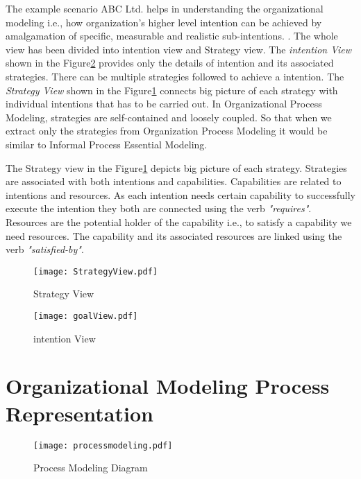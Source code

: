 \hspace{4ex} The example scenario ABC Ltd. helps in understanding the organizational modeling i.e., how organization's higher level intention can be achieved by amalgamation of specific, measurable and realistic sub-intentions. . The whole view has been divided into intention view and Strategy view. The \textit{intention View} shown in the Figure\ref{fig:intentionview} provides only the details of intention and its associated strategies. There can be multiple strategies followed to achieve a intention. The \textit{Strategy View} shown in the Figure\ref{fig:strategyview} connects big picture of each strategy with individual intentions that has to be carried out. In Organizational Process Modeling, strategies are self-contained and loosely coupled. So that when we extract only the strategies from Organization Process Modeling it would be similar to Informal Process Essential Modeling. 

\hspace{4ex} The Strategy view  in the Figure\ref{fig:strategyview} depicts big picture of each strategy. Strategies are associated with both intentions and capabilities. Capabilities are related to intentions and resources. As each intention needs certain capability to successfully execute the intention they both are connected using the verb \textit{"requires"}. Resources are the potential holder of the capability i.e., to satisfy a capability we need resources. The capability and its associated resources are linked using the verb \textit{"satisfied-by"}. 


\begin{figure}
	\centering
	\texttt{[image: StrategyView.pdf]}
	\caption{Strategy View}
	\label{fig:strategyview}
\end{figure}

\begin{figure}
	\centering
	\texttt{[image: goalView.pdf]}
	\caption{intention View}
	\label{fig:intentionview}
\end{figure}

\section{Organizational Modeling Process Representation}
\begin{figure}
	\centering
	\texttt{[image: processmodeling.pdf]}
	\caption{Process Modeling Diagram}
	\label{fig:processdiagram}
\end{figure}

